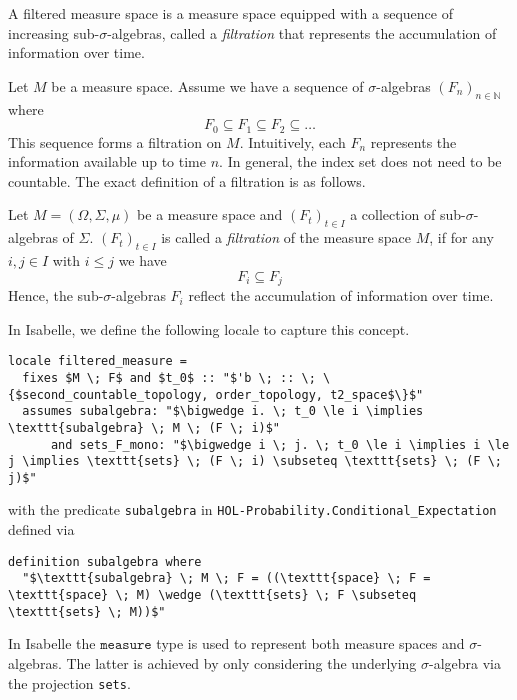A filtered measure space is a measure space equipped with a sequence of increasing sub-$\sigma$-algebras, called a \textit{filtration} that represents the accumulation of information over time.

Let $M$ be a measure space. Assume we have a sequence of $\sigma$-algebras $(F_n)_{n \in \mathbb{N}}$ where 
\[
	F_0 \subseteq F_1 \subseteq F_2 \subseteq \dots
\]
This sequence forms a filtration on $M$. Intuitively, each $F_n$ represents the information available up to time $n$. In general, the index set does not need to be countable. The exact definition of a filtration is as follows. 
\begin{definition}
	Let $M = (\Omega, \Sigma, \mu)$ be a measure space and $(F_t)_{t \in I}$ a collection of sub-$\sigma$-algebras of $\Sigma$. $(F_t)_{t \in I}$ is called a \textit{filtration} of the measure space $M$, if for any $i, j\in I$ with $i \le j$ we have 
	\[
		F_i \subseteq F_j
	\]
	Hence, the sub-$\sigma$-algebras $F_i$ reflect the accumulation of information over time.
\end{definition}

In Isabelle, we define the following locale to capture this concept.

\begin{isadefinition}
{\small
\begin{lstlisting}[style=isabelle]
locale filtered_measure = 
  fixes $M \; F$ and $t_0$ :: "$'b \; :: \; \{$second_countable_topology, order_topology, t2_space$\}$"
  assumes subalgebra: "$\bigwedge i. \; t_0 \le i \implies \texttt{subalgebra} \; M \; (F \; i)$"
      and sets_F_mono: "$\bigwedge i \; j. \; t_0 \le i \implies i \le j \implies \texttt{sets} \; (F \; i) \subseteq \texttt{sets} \; (F \; j)$"
\end{lstlisting}

with the predicate \texttt{subalgebra} in \texttt{HOL-Probability.Conditional\_Expectation} defined via

\begin{lstlisting}[style=isabelle]
definition subalgebra where
  "$\texttt{subalgebra} \; M \; F = ((\texttt{space} \; F = \texttt{space} \; M) \wedge (\texttt{sets} \; F \subseteq \texttt{sets} \; M))$"
  \end{lstlisting}
}
\end{isadefinition}

\begin{remark}
	In Isabelle the $\texttt{measure}$ type is used to represent both measure spaces and $\sigma$-algebras. The latter is achieved by only considering the underlying $\sigma$-algebra via the projection \texttt{sets}.
\end{remark}


